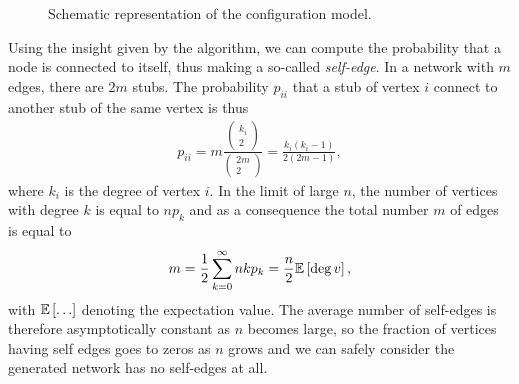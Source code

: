 \documentclass[
11pt, %
english, %
singlespacing, %
liststotoc, %
headsepline, %
]{MastersDoctoralThesis} %
\begin{document}
\begin{figure}
	
	\caption{Schematic representation of the configuration model.}
	\label{Figure: Configuration model}
\end{figure}

Using the insight given by the algorithm, we can compute the probability that a node is connected to itself, thus making a so-called \emph{self-edge}. In a network with $m$ edges, there are $2 m$ stubs. The probability $p_{ii}$ that a stub of vertex $i$ connect to another stub of the same vertex is thus
\begin{align}
	p_{ii} = m \frac{ \begin{pmatrix} k_i \\ 2 \end{pmatrix} }{ \begin{pmatrix} 2m \\ 2 \end{pmatrix} } = \frac{k_i (k_i - 1)}{2 (2m - 1)},
\end{align}
where $k_i$ is the degree of vertex $i$. In the limit of large $n$, the number of vertices with degree $k$ is equal to $n p_k$ and as a consequence the total number $m$ of edges is equal to
\begin{align}
	m = \frac{1}{2} \sum_{k = 0}^\infty n k p_k = \frac{n}{2} \mathbb{E}\left[ \deg{v} \right],
\end{align}
with $\expected{\dots}$ denoting the expectation value. The average number of self-edges is therefore asymptotically constant as $n$ becomes large, so the fraction of vertices having self edges goes to zeros as $n$ grows and we can safely consider the generated network has no self-edges at all.
\end{document}
